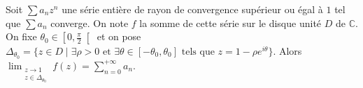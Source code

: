 





	\begin{theorem}
		\label{abel-angulaire-1}
		Soit $\sum a_n z^n$ une série entière de rayon de convergence supérieur ou égal à $1$ tel que $\sum a_n$ converge. On note $f$ la somme de cette série sur le disque unité $D$ de $\mathbb{C}$. On fixe $\theta_0 \in \left[ 0, \frac{\pi}{2} \right[$ et on pose $\Delta_{\theta_0} = \{ z \in D \mid \exists \rho > 0 \text{ et } \exists \theta \in [-\theta_0, \theta_0] \text{ tels que } z = 1 - \rho e^{i\theta} \}$.
		Alors $\lim_{\substack{z \rightarrow 1 \\ z \in \Delta_{\theta_0}}} f(z) = \sum_{n=0}^{+\infty} a_n$.
	\end{theorem}

